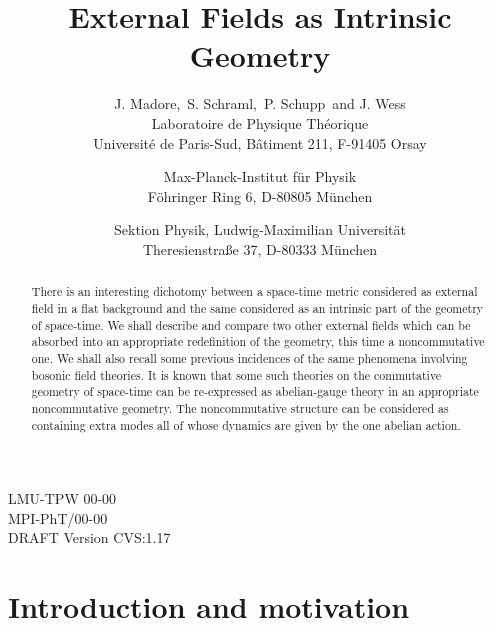 \documentclass[a4paper,12pt]{article}
\providecommand{\initiate}{\setcounter{equation}{0}}
\begin{document}
 

\title{External Fields as Intrinsic Geometry}

\author{J. Madore,\coordHE{}\  S. Schraml,\coordHE{}\ 
        P. Schupp\coordHE{}\ and J. Wess\coordHE{}\\[15pt]
        \myHighlight{$\strut^{1}$}\coordHE{}Laboratoire de Physique Th\'eorique\\
        Universit\'e de Paris-Sud, B\^atiment 211, F-91405 Orsay%
\and    \myHighlight{$\strut^{2}$}\coordHE{}Max-Planck-Institut f\"ur Physik\\
        F\"ohringer Ring 6, D-80805 M\"unchen%
\and    {}\coordHE{}Sektion Physik, Ludwig-Maximilian Universit\"at\\
        Theresienstra\ss e 37, D-80333 M\"unchen}

\date{}

\maketitle

\begin{abstract}
There is an interesting dichotomy between a space-time
metric considered as external field in a flat background and the
same considered as an intrinsic part of the geometry of space-time. 
We shall describe and compare two other external
fields which can be absorbed into an appropriate redefinition of the
geometry, this time a noncommutative one. We shall also recall some
previous incidences of the same phenomena involving bosonic field
theories. It is known that some such theories on the commutative
geometry of space-time can be re-expressed as abelian-gauge theory
in an appropriate noncommutative geometry. The noncommutative
structure can be considered as containing extra modes all of whose
dynamics are given by the one abelian action. 
\end{abstract}

\vfill
\noindent
LMU-TPW 00-00\\
\noindent
MPI-PhT/00-00\\
\noindent
DRAFT Version CVS:1.17
\newpage



\initiate
\section{Introduction and motivation}
\end{document}
